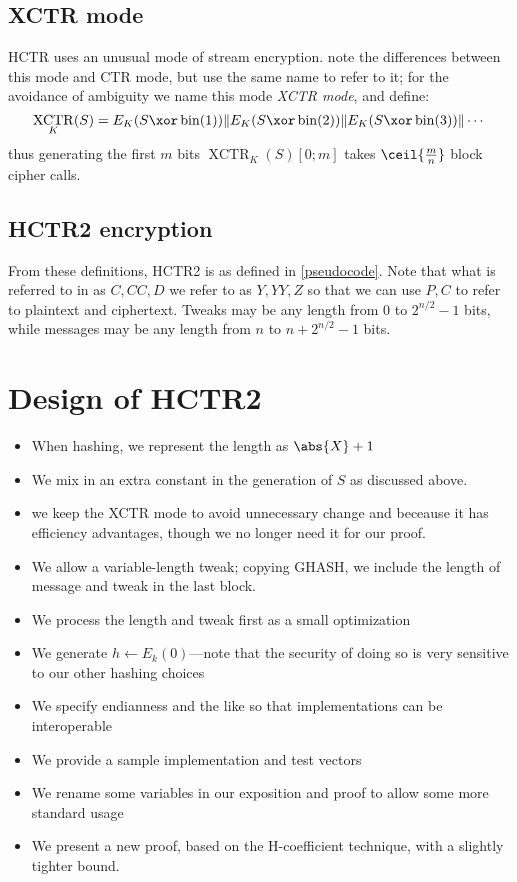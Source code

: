 \documentclass[letterpaper,11pt]{article}
\newcommand*{\Concat}{\Vert}
\DeclareMathOperator{\fromint}{bin}
\DeclareMathOperator{\XCTR}{XCTR}
\begin{document}
\subsection{XCTR mode}

HCTR uses an unusual mode of stream encryption.
\cite{hctr,hctrquad} note the differences between this mode and CTR mode,
but use the same name to refer to it; for the avoidance of ambiguity
we name this mode \emph{XCTR mode}, and define:
\begin{displaymath}
    \XCTR_K(S) = E_K(S \xor \fromint(1)) \Concat E_K(S \xor \fromint(2)) \Concat E_K(S \xor \fromint(3)) \Concat \cdots
\end{displaymath}
thus generating the first \(m\) bits \(\XCTR_K(S)[0; m]\) takes \(\ceil{\frac{m}{n}}\) block cipher calls.

\subsection{HCTR2 encryption}

From these definitions, HCTR2 is as defined in \autoref{pseudocode}.
Note that what is referred to in \cite{hctr,hctrquad} as \(C, \mathit{CC}, D\)
we refer to as \(Y, YY, Z\)
so that we can use \(P, C\) to refer to plaintext and ciphertext.
Tweaks may be any length from 0 to \(2^{n/2}-1\) bits, while
messages may be any length from \(n\) to \(n + 2^{n/2}-1\) bits.

\section{Design of HCTR2}
\begin{itemize}
    \item When hashing, we represent the length as \(\abs{X} + 1\)
    \item We mix in an extra constant in the generation of \(S\) as discussed above.
    \item we keep the XCTR mode to avoid unnecessary change and beceause it has efficiency
    advantages, though we no longer need it for our proof.
    \item We allow a variable-length tweak; copying GHASH\cite{gcm}, 
    we include the length of message and tweak in the last block. 
    \item We process the length and tweak first as a small optimization
    \item We generate \(h \gets E_k(0)\)---note that the security of doing so is very sensitive to our other hashing choices
    \item We specify endianness and the like so that implementations can be interoperable
    \item We provide a sample implementation and test vectors
    \item We rename some variables in our exposition and proof to allow some more standard usage
    \item We present a new proof, based on the H-coefficient technique, with a slightly tighter bound.
\end{itemize}
\end{document}
